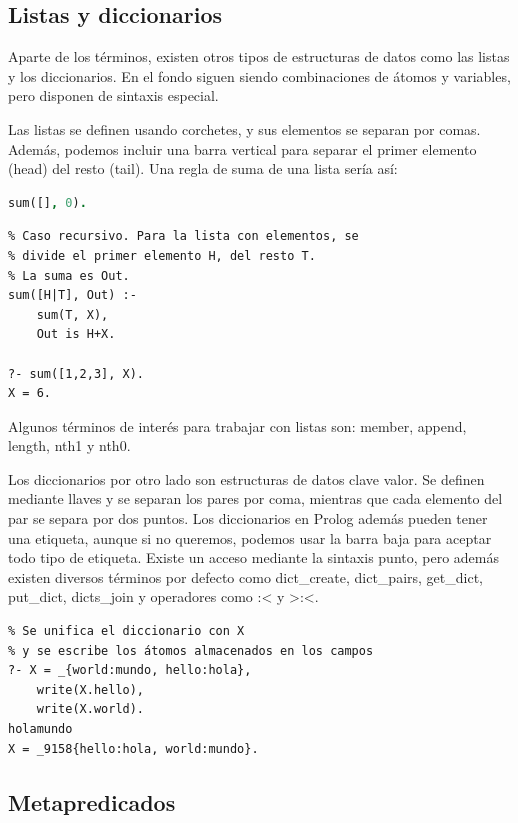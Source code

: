 \documentclass[openright,twoside,12pt]{book}
\begin{document}
\subsection{Listas y diccionarios}

Aparte de los términos, existen otros tipos de estructuras de datos como las listas y los diccionarios. En el fondo siguen siendo combinaciones de átomos y variables, pero disponen de sintaxis especial.

Las listas se definen usando corchetes, y sus elementos se separan por comas. Además, podemos incluir una barra vertical para separar el primer elemento (head) del resto (tail). Una regla de suma de una lista sería así:

\begin{lstlisting}[language=Prolog]
% Caso base. Para la lista vacía, la suma es 0
sum([], 0).
\end{lstlisting}
\begin{lstlisting}
% Caso recursivo. Para la lista con elementos, se
% divide el primer elemento H, del resto T.
% La suma es Out.
sum([H|T], Out) :-
    sum(T, X),
    Out is H+X.

?- sum([1,2,3], X).
X = 6.
\end{lstlisting}

Algunos términos de interés para trabajar con listas son: member, append, length, nth1 y nth0.

Los diccionarios por otro lado son estructuras de datos clave valor. Se definen mediante llaves y se separan los pares por coma, mientras que cada elemento del par se separa por dos puntos. Los diccionarios en Prolog además pueden tener una etiqueta, aunque si no queremos, podemos usar la barra baja para aceptar todo tipo de etiqueta. Existe un acceso mediante la sintaxis punto, pero además existen diversos términos por defecto como dict\_create, dict\_pairs, get\_dict, put\_dict, dicts\_join y operadores como :< y >:<.

\begin{lstlisting}
% Se unifica el diccionario con X
% y se escribe los átomos almacenados en los campos 
?- X = _{world:mundo, hello:hola}, 
    write(X.hello), 
    write(X.world).
holamundo
X = _9158{hello:hola, world:mundo}.
\end{lstlisting}

\subsection{Metapredicados}
\end{document}

